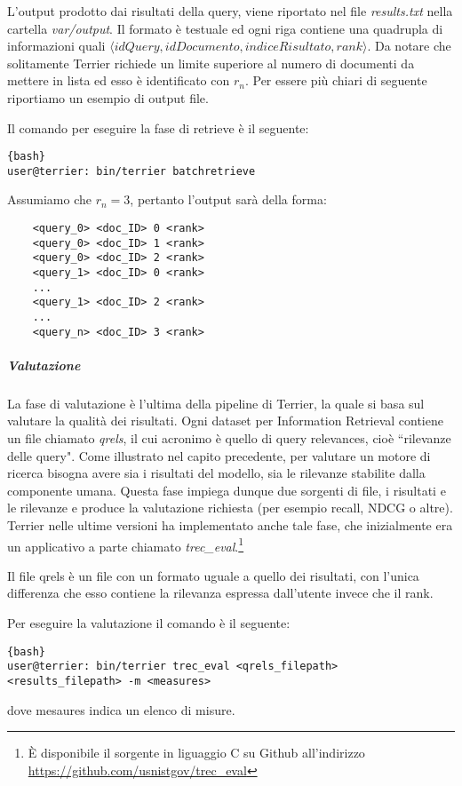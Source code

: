 L'output prodotto dai risultati della query, viene riportato
nel file \textit{results.txt} nella cartella \textit{var/output}. Il formato è testuale
ed ogni riga contiene una quadrupla di informazioni quali
$\langle idQuery, idDocumento, indiceRisultato, rank \rangle$.
Da notare che solitamente Terrier richiede un limite superiore
al numero di documenti da mettere in lista ed esso è identificato
con $r_n$. Per essere più chiari di seguente riportiamo un esempio
di output file.

Il comando per eseguire la fase di retrieve è il seguente:
\begin{lstlisting}{bash}
user@terrier: bin/terrier batchretrieve
\end{lstlisting}

\begin{esempio}
	Assumiamo che $r_n=3$, pertanto l'output sarà della forma:
	
	\begin{lstlisting}
	<query_0> <doc_ID> 0 <rank>
	<query_0> <doc_ID> 1 <rank>
	<query_0> <doc_ID> 2 <rank>
	<query_1> <doc_ID> 0 <rank>
	...
	<query_1> <doc_ID> 2 <rank>
	...
	<query_n> <doc_ID> 3 <rank>
	\end{lstlisting}
\end{esempio}

\subparagraph{Valutazione} La fase di valutazione
è l'ultima della pipeline di Terrier, la quale si basa sul valutare la qualità dei risultati.
Ogni dataset per Information Retrieval contiene un file chiamato \textit{qrels}, il cui
acronimo è quello di query relevances, cioè ``rilevanze delle query".
Come illustrato nel capito precedente, per valutare un motore di ricerca bisogna
avere sia i risultati del modello, sia le rilevanze stabilite dalla componente umana.
Questa fase impiega dunque due sorgenti di file, i risultati e le rilevanze e produce
la valutazione richiesta (per esempio recall, NDCG o altre).
Terrier nelle ultime versioni ha implementato anche tale fase,
che inizialmente era un applicativo a parte chiamato \textit{trec\_eval}.\footnote{\`E disponibile il sorgente in liguaggio C su Github all'indirizzo \href{https://github.com/usnistgov/trec_eval}{https://github.com/usnistgov/trec\_eval}}

Il file qrels è un file con un formato uguale a quello dei risultati,
con l'unica differenza che esso contiene la rilevanza espressa dall'utente invece che il rank.

Per eseguire la valutazione il comando è il seguente:
\begin{lstlisting}{bash}
user@terrier: bin/terrier trec_eval <qrels_filepath> <results_filepath> -m <measures>
\end{lstlisting}

dove mesaures indica un elenco di misure.